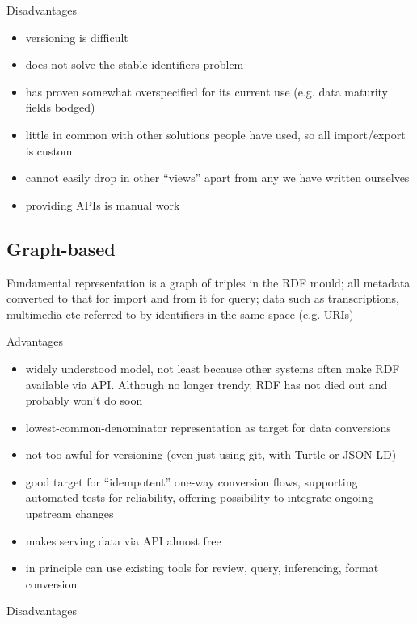 \documentclass[sigconf]{acmart}
\begin{document}
\begin{sloppypar}
  Disadvantages

  \begin{itemize}
  \item versioning is difficult
  \item does not solve the stable identifiers problem
  \item has proven somewhat overspecified for its current use
    (e.g. data maturity fields bodged)
  \item little in common with other solutions people have used, so all
    import/export is custom
  \item cannot easily drop in other ``views'' apart from any we have
    written ourselves
  \item providing APIs is manual work
  \end{itemize}

  \subsection{Graph-based}

  Fundamental representation is a graph of triples in the RDF mould;
  all metadata converted to that for import and from it for query;
  data such as transcriptions, multimedia etc referred to by
  identifiers in the same space (e.g. URIs)

  Advantages

  \begin{itemize}
    \item widely understood model, not least because other systems
      often make RDF available via API. Although no longer trendy, RDF
      has not died out and probably won't do soon
    \item lowest-common-denominator representation as target for data
      conversions
    \item not too awful for versioning (even just using git, with
      Turtle or JSON-LD)
    \item good target for ``idempotent'' one-way conversion flows,
      supporting automated tests for reliability, offering possibility
      to integrate ongoing upstream changes
    \item makes serving data via API almost free
    \item in principle can use existing tools for review, query,
      inferencing, format conversion
  \end{itemize}

  Disadvantages


\end{sloppypar}
\end{document}
